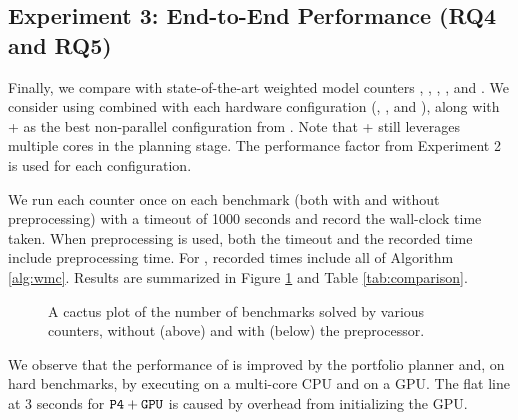 \subsection{Experiment 3: End-to-End Performance (RQ4 and RQ5)}
Finally, we compare  with state-of-the-art weighted model counters , , , , and . We consider  using  combined with each hardware configuration (, , and ), along with  +  as the best non-parallel configuration from \cite{DDV19}. Note that + still leverages multiple cores in the planning stage. The performance factor from Experiment 2 is used for each  configuration.

We run each counter once on each benchmark (both with and without  preprocessing) with a timeout of 1000 seconds and record the wall-clock time taken. When preprocessing is used, both the timeout and the recorded time include preprocessing time. For , recorded times include all of Algorithm \ref{alg:wmc}. Results are summarized in Figure \ref{fig:parallel:comparison} and Table \ref{tab:comparison}. 

\begin{figure}[t]
\begin{center}

%
\vspace*{-0.5cm}
\caption{\label{fig:parallel:comparison} A cactus plot of the number of benchmarks solved by various counters, without (above) and with (below) the  \cite{LM14} preprocessor.}
\end{center}
\vspace*{-0.8cm}
\end{figure}

We observe that the performance of  is improved by the portfolio planner and, on hard benchmarks, by executing on a multi-core CPU and on a GPU. The flat line at 3 seconds for $\texttt{\upshape P4}+\texttt{\upshape GPU}$ is caused by overhead from initializing the GPU.



